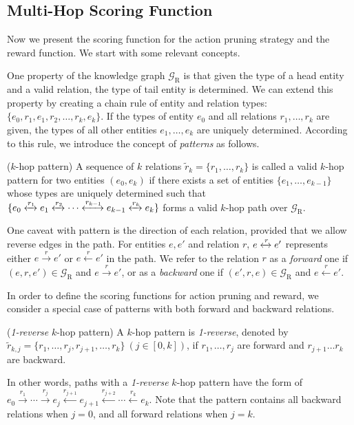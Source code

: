 \documentclass[sigconf]{acmart}
\begin{document}
\subsection{Multi-Hop Scoring Function}
Now we present the scoring function for the action pruning strategy and the reward function. We start with some relevant concepts.

One property of the knowledge graph $\mathcal{G}_\text{R}$ is that given the type of a head entity and a valid relation, the type of tail entity is determined. We can extend this property by creating a chain rule of entity and relation types: $\{e_0,r_1, e_1, r_2, \ldots, r_k, e_k\}$. If the types of entity $e_0$ and all relations $r_1,\ldots,r_k$ are given, the types of all other entities $e_1,\ldots,e_k$ are uniquely determined.
According to this rule, we introduce the concept of \emph{patterns} as follows.
\begin{definition}{($k$-hop pattern)}
A sequence of $k$ relations  $\tilde{r}_k=\{r_1,\ldots,r_k\}$ is called a valid $k$-hop pattern for two entities $(e_0,e_k)$ if there exists a set of entities $\{e_1,\ldots,e_{k-1}\}$ whose types are uniquely determined such that $\{e_0 \xleftrightarrow{r_1} e_1 \xleftrightarrow{r_2} \cdots \xleftrightarrow{r_{k-1}}e_{k-1}\xleftrightarrow{r_k} e_k \}$ forms a valid $k$-hop path over $\mathcal{G}_\text{R}$.
\end{definition}

One caveat with pattern is the direction of each relation, provided that we allow reverse edges in the path. For entities $e,e'$ and relation $r$, $e\xleftrightarrow{r} e'$ represents either $e\xrightarrow{r} e'$ or $e\xleftarrow{r} e'$ in the path.
We refer to the relation $r$ as a \emph{forward} one if $(e,r,e')\in\mathcal{G}_\text{R}$ and $e\xrightarrow{r} e'$, or as a \emph{backward} one if $(e',r,e)\in\mathcal{G}_\text{R}$ and $e\xleftarrow{r} e'$.

In order to define the scoring functions for action pruning and reward, we consider a special case of patterns with both forward and backward relations.
\begin{definition}{(\emph{1-reverse} $k$-hop pattern)}
A $k$-hop pattern is \emph{1-reverse}, denoted by $\tilde{r}_{k,j}=\{r_1,\ldots,r_j,r_{j+1},\ldots,r_k\}~(j\in[0,k])$, if $r_1,\ldots,r_j$ are forward and $r_{j+1}\ldots r_k$ are backward.
\end{definition}
In other words, paths with a \emph{1-reverse} $k$-hop pattern have the form of $e_0\xrightarrow{r_1}\cdots \xrightarrow{r_j}e_j\xleftarrow{r_{j+1}}e_{j+1}\xleftarrow{r_{j+2}}\cdots\xleftarrow{r_k} e_{k}$.
Note that the pattern contains all backward relations when $j=0$, and all forward relations when $j=k$.
\end{document}
